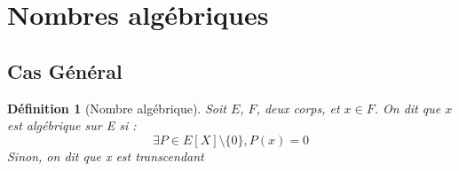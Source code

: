 \documentclass[a4paper,12pt,french]{report}
\newtheorem{definition}{Définition}[section]
\begin{document}
    

		\section{Nombres algébriques}
			\subsection{Cas Général}
			\begin{definition}[Nombre algébrique]
				Soit \(E\), \(F\), deux corps,  et \(x \in F\). On dit que \(x\) est \emph{algébrique} sur E si : 
				\[
					\exists P \in E[X]\setminus\{0\} , P(x) = 0
				\]
				Sinon, on dit que x est \emph{transcendant}
			\end{definition}
			
\end{document}
